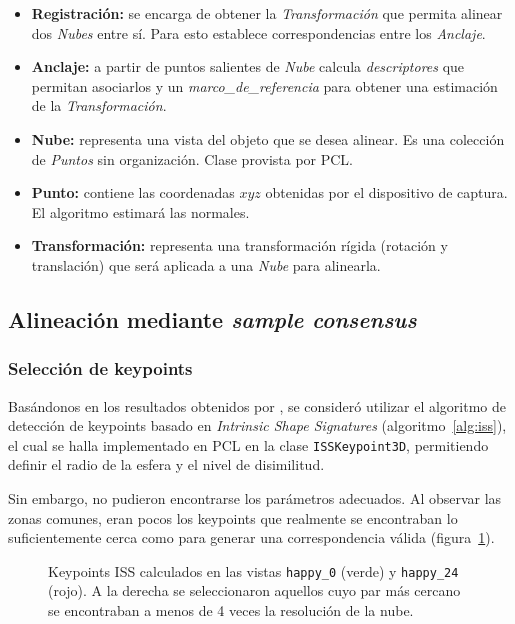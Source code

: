 		\begin{itemize}
			\item {\bfseries Registración:} se encarga de obtener la \emph{Transformación} que
				permita alinear dos \emph{Nubes} entre sí.  Para esto establece
				correspondencias entre los \emph{Anclaje}.
			\item {\bfseries Anclaje:} a partir de puntos salientes de \emph{Nube} calcula
				\emph{descriptores}  que permitan asociarlos y un
				\emph{marco\_de\_referencia} para obtener una estimación de la
				\emph{Transformación}.
			\item {\bfseries Nube:} representa una vista del objeto que se desea alinear.
				Es una colección de \emph{Puntos} sin organización. Clase
				provista por PCL.
			\item {\bfseries Punto:} contiene las coordenadas $xyz$ obtenidas por el
				dispositivo de captura. El algoritmo estimará las normales.
			\item {\bfseries Transformación:} representa una transformación rígida
				(rotación y translación) que será aplicada a una \emph{Nube}
				para alinearla.
		\end{itemize}


	\subsection{Alineación mediante \emph{sample consensus}}
		\subsubsection{Selección de keypoints}
			Basándonos en los resultados obtenidos por \cite{ISS},
			se consideró utilizar el algoritmo de detección de keypoints basado en \emph{Intrinsic Shape Signatures} (algoritmo~\ref{alg:iss}),
			el cual se halla implementado en PCL en la clase \texttt{ISSKeypoint3D}, permitiendo
			definir el radio de la esfera y el nivel de disimilitud.

			Sin embargo, no pudieron encontrarse los parámetros adecuados.
			Al observar las zonas comunes, eran pocos los keypoints que
			realmente se encontraban lo suficientemente cerca como para generar
			una correspondencia válida (figura~\ref{fig:iss_key}).


			\begin{figure}
				\caption{\label{fig:iss_key}Keypoints ISS calculados en las vistas \texttt{happy\_0} (verde) y \texttt{happy\_24} (rojo).
				A la derecha se seleccionaron aquellos cuyo par más cercano se encontraban a menos de 4 veces la resolución de la nube.
				}
			\end{figure}

